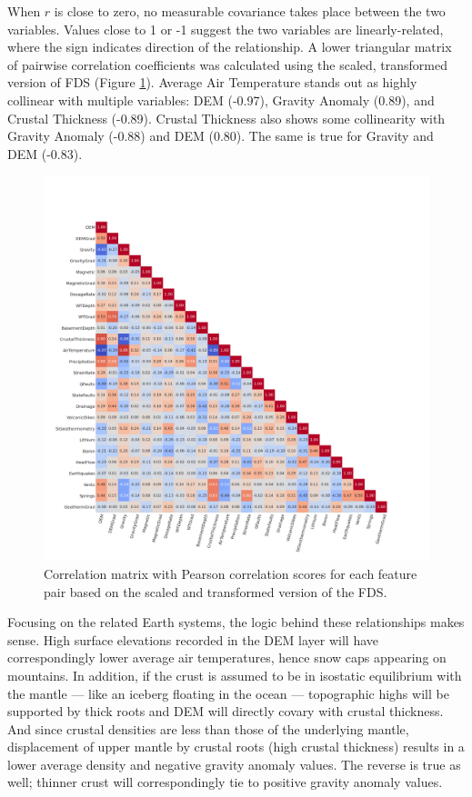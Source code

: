When $r$ is close to zero, no measurable covariance takes place between the two variables. Values close to 1 or -1 suggest the two variables are linearly-related, where the sign indicates direction of the relationship. A lower triangular matrix of pairwise correlation coefficients was calculated using the scaled, transformed version of FDS (Figure \ref{fig:corr_matrix}). Average Air Temperature stands out as highly collinear with multiple variables: DEM (-0.97), Gravity Anomaly (0.89), and Crustal Thickness (-0.89). Crustal Thickness also shows some collinearity with Gravity Anomaly (-0.88) and DEM (0.80). The same is true for Gravity and DEM (-0.83).

\begin{figure}[!htp]
\centering
\includegraphics[width=\textwidth]{templates/images/Figure-Scaled_Correlation_Matrix.png}
\caption[Feature correlation matrix]{Correlation matrix with Pearson correlation scores for each feature pair based on the scaled and transformed version of the FDS.}
\label{fig:corr_matrix}
\end{figure}

Focusing on the related Earth systems, the logic behind these relationships makes sense. High surface elevations recorded in the DEM layer will have correspondingly lower average air temperatures, hence snow caps appearing on mountains. In addition, if the crust is assumed to be in isostatic equilibrium with the mantle --- like an iceberg floating in the ocean --- topographic highs will be supported by thick roots and DEM will directly covary with crustal thickness. And since crustal densities are less than those of the underlying mantle, displacement of upper mantle by crustal roots (high crustal thickness) results in a lower average density and negative gravity anomaly values. The reverse is true as well; thinner crust will correspondingly tie to positive gravity anomaly values.  

